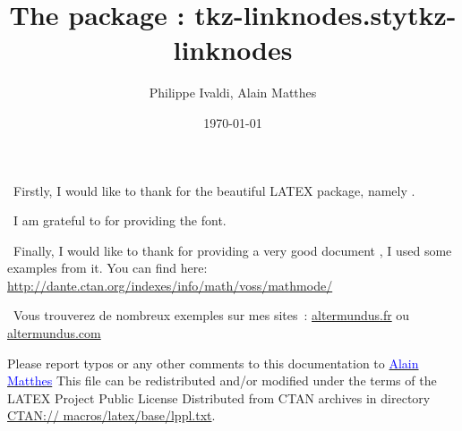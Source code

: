 \documentclass[DIV=14,
               fontsize=10,
               headinclude=false,
               index=totoc,
               footinclude=false,
               headings=small]{tkz-doc}
\title{The package : tkz-linknodes.sty}
\author{Philippe Ivaldi, Alain Matthes}
\gdef\nameofpack{tkz-linknodes}
\begin{document}
\title{\nameofpack}
\date{\today}
\clearpage
\thispagestyle{empty}
\maketitle

\clearpage
\pagecolor{fondpaille}
\color{Maroon} 

  \nameoffile{\nameofpack} 



\presentation  

\vspace*{1cm}  
\lefthand\ Firstly, I would like to thank  for the  beautiful LATEX package, namely \TIKZ.

\vspace*{12pt}    
\lefthand\ I am grateful to   for providing the  font.

\vspace*{12pt}
\lefthand\ Finally, I would like to thank  for providing
 a very good document  , I used some examples from it. You can find  here:\newline
\url{http://dante.ctan.org/indexes/info/math/voss/mathmode/}

\vspace*{12pt}
\lefthand\ Vous trouverez de nombreux exemples sur mes sites~: 
\href{http://altermundus.com/pages/download.html}{altermundus.fr} ou 
\href{http://altermundus.fr/pages/download.html}{altermundus.com}   

\vspace*{12pt}  
Please report typos or any other comments to this documentation to \href{mailto:al.ma@mac.com}{\textcolor{blue}{Alain Matthes}}
This file can be redistributed and/or modified under the terms of the LATEX 
Project Public License Distributed from CTAN archives in directory \url{CTAN:// 
macros/latex/base/lppl.txt}. 

\clearpage
\tableofcontents
\newpage 
\end{document}
